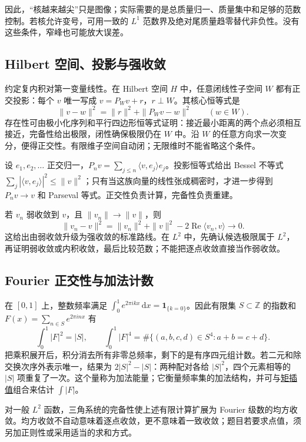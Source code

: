 \documentclass[UTF8,12pt,a4paper,fontset=fandol]{ctexart}
\begin{document}
因此，“核越来越尖”只是图像；实际需要的是总质量归一、质量集中和足够的范数控制。若核允许变号，可用一致的 $L^1$ 范数界及绝对尾质量趋零替代非负性。没有这些条件，窄峰也可能放大误差。

\subsection{Hilbert 空间、投影与强收敛}

\label{app:integration-hilbert}

约定复内积对第一变量线性。在 Hilbert 空间 $H$ 中，任意闭线性子空间 $W$ 都有正交投影：每个 $v$ 唯一写成 $v=P_Wv+r$，$r\perp W$。其核心恒等式是
\[
\|v-w\|^2=\|r\|^2+\|P_Wv-w\|^2\qquad(w\in W).
\]
存在性可由极小化序列和平行四边形恒等式证明：接近最小距离的两个点必须相互接近，完备性给出极限，闭性确保极限仍在 $W$ 中。沿 $W$ 的任意方向求一次变分，便得正交性。有限维子空间自动闭；无限维时不能省略这个条件。

设 $e_1,e_2,\ldots$ 正交归一，$P_nv=\sum_{j\leq n}\langle v,e_j\rangle e_j$。投影恒等式给出 Bessel 不等式 $\sum_j|\langle v,e_j\rangle|^2\leq\|v\|^2$；只有当这族向量的线性张成稠密时，才进一步得到 $P_nv\to v$ 和 Parseval 等式。正交性负责计算，完备性负责重建。

若 $v_n$ 弱收敛到 $v$，且 $\|v_n\|\to\|v\|$，则
\[
\|v_n-v\|^2=\|v_n\|^2+\|v\|^2-2\operatorname{Re}\langle v_n,v\rangle\longrightarrow0.
\]
这给出由弱收敛升级为强收敛的标准路线。在 $L^2$ 中，先确认候选极限属于 $L^2$，再证明弱收敛或内积收敛，最后比较范数；不能把逐点收敛直接当作弱收敛。

\subsection{Fourier 正交性与加法计数}

\label{app:integration-fourier}

在 $[0,1]$ 上，整数频率满足 $\int_0^1e^{2\pi ikx}\,\mathrm dx=\mathbf1_{\{k=0\}}$。因此有限集 $S\subset\mathbb Z$ 的指数和 $F(x)=\sum_{n\in S}e^{2\pi inx}$ 有
\[
\int_0^1|F|^2=|S|,\qquad
\int_0^1|F|^4=\#\{(a,b,c,d)\in S^4:a+b=c+d\}.
\]
把乘积展开后，积分消去所有非零总频率，剩下的是有序四元组计数。若二元和除交换次序外表示唯一，结果为 $2|S|^2-|S|$：两种配对各给 $|S|^2$，四个元素相等的 $|S|$ 项重复了一次。这个量称为加法能量；它衡量频率集的加法结构，并可与\hyperref[app:estimate-moments]{矩插值}组合来估计 $\int|F|$。

对一般 $L^2$ 函数，三角系统的完备性使上述有限计算扩展为 Fourier 级数的均方收敛。均方收敛不自动意味着逐点收敛，更不意味着一致收敛；题目若要求点值，须另加正则性或采用适当的求和方式。
\end{document}

